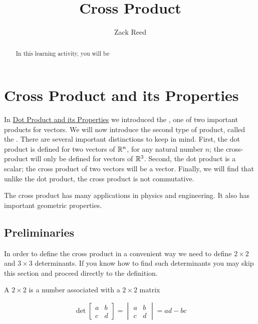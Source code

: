 \documentclass{ximera}
\author{Zack Reed}
\title{Cross Product}
\begin{document}
\begin{abstract}

    In this learning activity, you will be 
\end{abstract}
\maketitle

\section*{Cross Product and its Properties}
In \href{https://ximera.osu.edu/appliedlinearalgebra/c5ChapterFive/learningActivities/m5LearningActivities/m5DotProduct/dotProduct}{Dot Product and its Properties} we introduced the , one of two important products for vectors.  We will now introduce the second type of product, called the .  There are several important distinctions to keep in mind.  First, the dot product is defined for two vectors of $\mathbb{R}^n$, for any  natural number $n$; the cross-product will only be defined for vectors of $\mathbb{R}^3$.  Second, the dot product is a scalar; the cross product of two vectors will be a vector.  Finally, we will find that unlike the dot product, the cross product is not commutative. 
 
The cross product has many applications in physics and engineering.  It also has important geometric properties.
 
\subsection*{Preliminaries}
In order to define the cross product in a convenient way we need to define $2\times 2$ and $3\times 3$ determinants.  If you know how to find such determinants you may skip this section and proceed directly to the definition.
 
\begin{definition}\label{def:twodetcrossprod}
A $2\times 2$  is a number associated with a $2\times 2$ matrix
 
$$\det{\begin{bmatrix}
a & b\\
c & d
\end{bmatrix}}=\begin{vmatrix}
a & b\\
c & d
\end{vmatrix} =ad-bc$$
 
\end{definition}
 
\end{document}
